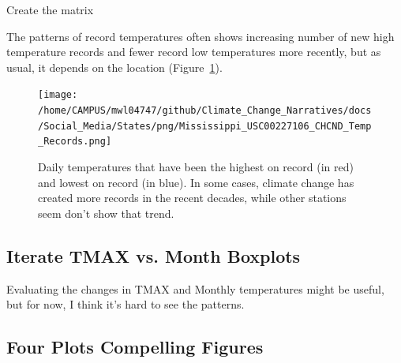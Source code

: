 \documentclass{article}
\begin{document}
Create the matrix
\begin{knitrout}
\color{fgcolor}\begin{kframe}


{\ttfamily\noindent\bfseries\color{errorcolor}{\#\# Error in TMAX.mat.noleap[j, year.seq\$Col[year.seq\$Year == i]] <- CHCND.noleap\$TMAX[CHCND.noleap\$Year == : replacement has length zero}}\end{kframe}
\end{knitrout}


\begin{knitrout}
\color{fgcolor}\begin{kframe}


{\ttfamily\noindent\bfseries\color{errorcolor}{\#\# Error in eval(expr, envir, enclos): no loop for break/next, jumping to top level}}

{\ttfamily\noindent\bfseries\color{errorcolor}{\#\# Error in eval(expr, envir, enclos): no loop for break/next, jumping to top level}}\end{kframe}
\end{knitrout}

The patterns of record temperatures often shows increasing number of new high temperature records  and fewer record low temperatures more recently, but as usual, it depends on the location (Figure~\ref{fig:Records}).
\begin{figure}
\texttt{[image: /home/CAMPUS/mwl04747/github/Climate\_Change\_Narratives/docs/Social\_Media/States/png/Mississippi\_USC00227106\_CHCND\_Temp\_Records.png]}
\caption{Daily temperatures that have been the highest on record (in red) and lowest on record (in blue). In some cases, climate change has created more records in the recent decades, while other stations seem don't show that trend.}
\label{fig:Records}
\end{figure}

\subsection{Iterate TMAX vs. Month Boxplots}

Evaluating the changes in TMAX and Monthly temperatures might be useful, but for now, I think it's hard to see the patterns. 




\subsection{Four Plots Compelling Figures}
\end{document}
